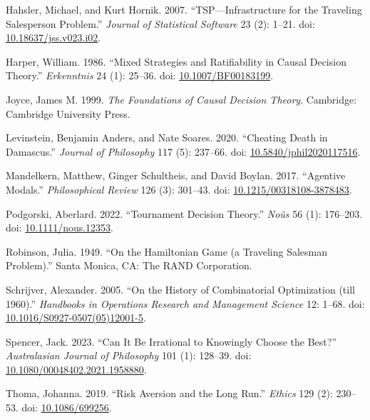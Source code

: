 \documentclass[
  10pt,
  letterpaper,
  DIV=11,
  numbers=noendperiod,
  twoside]{scrartcl}
\newlength{\cslhangindent}
\newenvironment{CSLReferences}[2] %
 {\begin{list}{}{%
  \setlength{\itemindent}{0pt}
  \setlength{\leftmargin}{0pt}
  \setlength{\parsep}{0pt}
  \ifodd #1
   \setlength{\leftmargin}{\cslhangindent}
   \setlength{\itemindent}{-1\cslhangindent}
  \fi
  \setlength{\itemsep}{#2\baselineskip}}}
 {\end{list}}
\begin{document}
\begin{CSLReferences}{1}{0}
Hahsler, Michael, and Kurt Hornik. 2007. {``TSP---Infrastructure for the
Traveling Salesperson Problem.''} \emph{Journal of Statistical Software}
23 (2): 1--21. doi:
\href{https://doi.org/10.18637/jss.v023.i02}{10.18637/jss.v023.i02}.

Harper, William. 1986. {``Mixed Strategies and Ratifiability in Causal
Decision Theory.''} \emph{Erkenntnis} 24 (1): 25--36. doi:
\href{https://doi.org/10.1007/BF00183199}{10.1007/BF00183199}.

Joyce, James M. 1999. \emph{The Foundations of Causal Decision Theory}.
Cambridge: Cambridge University Press.

Levinstein, Benjamin Anders, and Nate Soares. 2020. {``Cheating Death in
Damascus.''} \emph{Journal of Philosophy} 117 (5): 237--66. doi:
\href{https://doi.org/10.5840/jphil2020117516}{10.5840/jphil2020117516}.

Mandelkern, Matthew, Ginger Schultheis, and David Boylan. 2017.
{``Agentive Modals.''} \emph{Philosophical Review} 126 (3): 301--43.
doi:
\href{https://doi.org/10.1215/00318108-3878483}{10.1215/00318108-3878483}.

Podgorski, Aberlard. 2022. {``Tournament Decision Theory.''}
\emph{No{û}s} 56 (1): 176--203. doi:
\href{https://doi.org/10.1111/nous.12353}{10.1111/nous.12353}.

Robinson, Julia. 1949. {``On the Hamiltonian Game (a Traveling Salesman
Problem).''} Santa Monica, CA: The RAND Corporation.

Schrijver, Alexander. 2005. {``On the History of Combinatorial
Optimization (till 1960).''} \emph{Handbooks in Operations Research and
Management Science} 12: 1--68. doi:
\href{https://doi.org/10.1016/S0927-0507(05)12001-5}{10.1016/S0927-0507(05)12001-5}.

Spencer, Jack. 2023. {``Can It Be Irrational to Knowingly Choose the
Best?''} \emph{Australasian Journal of Philosophy} 101 (1): 128--39.
doi:
\href{https://doi.org/10.1080/00048402.2021.1958880}{10.1080/00048402.2021.1958880}.

Thoma, Johanna. 2019. {``Risk Aversion and the Long Run.''}
\emph{Ethics} 129 (2): 230--53. doi:
\href{https://doi.org/10.1086/699256}{10.1086/699256}.


\end{CSLReferences}
\end{document}
